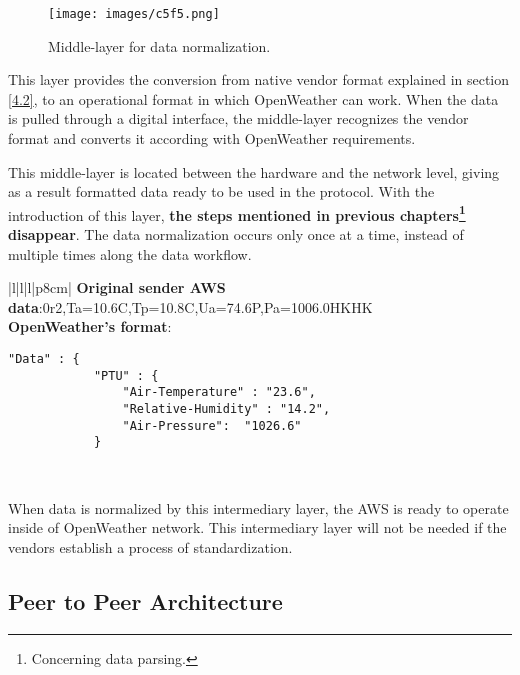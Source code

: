 \begin{figure}[H]
\centerline{\texttt{[image: images/c5f5.png]}}
\caption{Middle-layer for data normalization.}
\end{figure}

This layer provides the conversion from native vendor format explained in section \ref{4.2}, to an operational format in which OpenWeather can work. When the data is pulled through a digital interface, the middle-layer recognizes the vendor format and converts it according with OpenWeather requirements.

This middle-layer is located between the hardware and the network level, giving as a result formatted data ready to be used in the protocol. With the introduction of this layer, \textbf{the steps mentioned in previous chapters\footnote{Concerning data parsing.} disappear}. The data normalization occurs only once at a time, instead of multiple times along the data workflow.

\begin{table}[H]
\centering
\begin{tabular}{|l|l|l|p{8cm}|}
\hline    
\textbf{Original sender \gls{AWS} data}:0r2,Ta=10.6C,Tp=10.8C,Ua=74.6P,Pa=1006.0HKHK\\
\hline
\textbf{OpenWeather's format}:  \\
\begin{minipage}[t]{\linewidth}
	\begin{verbatim}
"Data" : { 
            "PTU" : {
                "Air-Temperature" : "23.6", 
                "Relative-Humidity" : "14.2", 
                "Air-Pressure":  "1026.6" 
            }
           \end{verbatim}
\end{minipage} \\
\hline
\end{tabular}
\caption{Comparison of one vendor format against OpenWeather \protect \gls{JSON} format.}
\end{table}

When data is normalized by this intermediary layer, the \gls{AWS} is ready to operate inside of OpenWeather network. This intermediary layer will not be needed if the vendors establish a process of standardization.

\subsection{Peer to Peer Architecture}\label{5.2.1}

